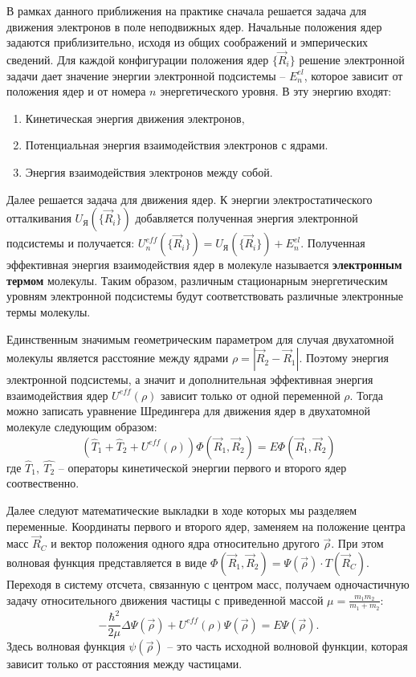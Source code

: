 \documentclass[a4paper, 12pt]{article}
\begin{document}
В рамках данного приближения на практике сначала решается задача для движения электронов в поле неподвижных ядер.
Начальные положения ядер задаются приблизительно, исходя из общих соображений и эмперических сведений. Для каждой конфигурации положения ядер $\{\vec{R}_i\}$ решение электронной задачи дает значение энергии электронной подсистемы -- $E^{el}_n$, которое зависит от положения ядер и от номера $n$ энергетического уровня. В эту энергию входят:
\begin{enumerate}
\item Кинетическая энергия движения электронов,
\item Потенциальная энергия взаимодействия электронов с ядрами.
\item Энергия взаимодействия электронов между собой.
\end{enumerate}
Далее решается задача для движения ядер. К энергии электростатического отталкивания $U_{\text{Я}}\left(\{\vec{R}_i\}\right)$ добавляется полученная энергия электронной подсистемы и получается: $U_n^{eff}\left(\{\vec{R}_i\}\right)=U_{\text{Я}}\left(\{\vec{R}_i\}\right)+E^{el}_n$. Полученная эффективная энергия взаимодействия ядер в молекуле называется \textbf{электронным термом} молекулы. Таким образом, различным стационарным энергетическим уровням электронной подсистемы будут соответствовать различные электронные термы молекулы.

Единственным значимым геометрическим параметром для случая двухатомной молекулы является расстояние между ядрами $\rho=|\vec{R}_2-\vec{R}_1|$. Поэтому энергия электронной подсистемы, а значит и дополнительная эффективная энергия взаимодействия ядер $U^{eff}\left(\rho\right)$ зависит только от одной переменной $\rho$. Тогда можно записать уравнение Шредингера для движения ядер в двухатомной молекуле следующим образом:
\begin{equation}
	\left(\hat{T}_1+\hat{T}_2+U^{eff}(\rho)\right)\Phi\left(\vec{R}_1,\vec{R}_2\right)=E\Phi\left(\vec{R}_1,\vec{R}_2\right)
\end{equation}
где $\hat{T}_1,\ \hat{T_2}$ -- операторы кинетической энергии первого и второго ядер соотвественно.

Далее следуют математические выкладки в ходе которых мы разделяем переменные. Координаты первого и второго ядер, заменяем на положение центра масс $\vec{R}_C$ и вектор положения одного ядра относительно другого $\vec{\rho}$. При этом волновая функция представляется в виде $\Phi\left(\vec{R}_1,\vec{R}_2\right)=\Psi\left(\vec{\rho}\right)\cdot T\left(\vec{R}_C\right)$. Переходя в систему отсчета, связанную с центром масс, получаем одночастичную задачу относительного движения частицы с приведенной массой $\mu=\frac{m_1m_2}{m_1+m_2}$:
\begin{equation}
-\frac{\hbar^2}{2\mu}\Delta\Psi(\vec{\rho})+U^{eff}(\rho)\Psi(\vec{\rho})=E\Psi(\vec{\rho}).
\end{equation}
Здесь волновая функция $\psi(\vec{\rho})$ -- это часть исходной волновой функции, которая зависит только от расстояния между частицами.
\end{document}
